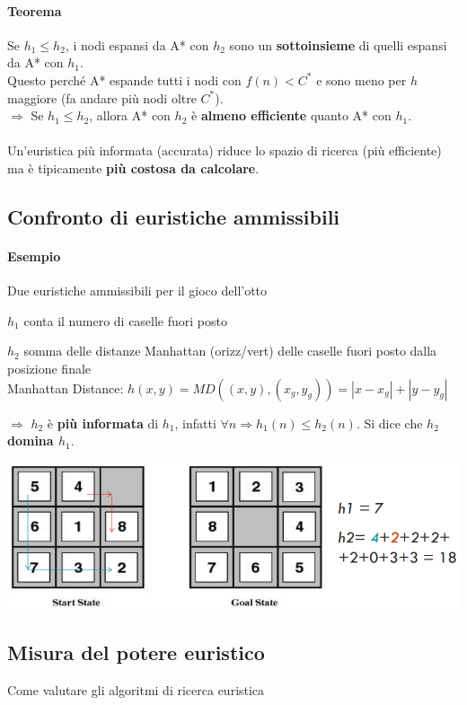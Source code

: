 \documentclass[10pt]{book}
\begin{document}
\paragraph{Teorema} Se $h_1 \leq h_2$, i nodi espansi da A* con $h_2$ sono un \textbf{sottoinsieme} di quelli espansi da A* con $h_1$.\\
Questo perché A* espande tutti i nodi con $f(n) < C^*$ e sono meno per $h$ maggiore (fa andare più nodi oltre $C^*$).\\
$\Rightarrow$ Se $h_1 \leq h_2$, allora A* con $h_2$ è \textbf{almeno efficiente} quanto A* con $h_1$.\\\\
Un'euristica più informata (accurata) riduce lo spazio di ricerca (più efficiente) ma è tipicamente \textbf{più costosa da calcolare}.
\subsection{Confronto di euristiche ammissibili}
\paragraph{Esempio} Due euristiche ammissibili per il gioco dell'otto
\begin{list}{}{}
	\item $h_1$ conta il numero di caselle fuori posto
	\item $h_2$ somma delle distanze Manhattan (orizz/vert) delle caselle fuori posto dalla posizione finale\\
	Manhattan Distance: $h(x, y) = MD((x, y), (x_g, y_g)) = |x - x_g| + |y - y_g|$
\end{list}
$\Rightarrow$ $h_2$ è \textbf{più informata} di $h_1$, infatti $\forall n \Rightarrow h_1(n) \leq h_2(n)$. Si dice che \textbf{$h_2$ domina $h_1$}.
\begin{center}
	\includegraphics[scale=0.7]{confrh.png}
\end{center}
\subsection{Misura del potere euristico}
Come valutare gli algoritmi di ricerca euristica
\end{document}
